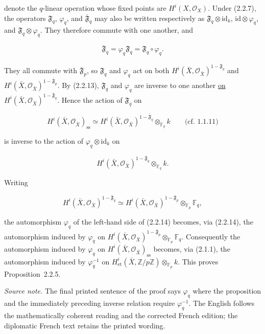 denote the $q$-linear operation whose fixed points are
$H^i(X,\mathcal O_X)$. Under (2.2.7), the operators
$\mathfrak F_q$, $\varphi_q$, and $\overline{\mathfrak F}_q$ may also be
written respectively as
$\mathfrak F_q\otimes\mathrm{id}_k$,
$\mathrm{id}\otimes\varphi_q$, and
$\mathfrak F_q\otimes\varphi_q$. They therefore commute with one another,
and

\begin{equation}\tag{2.2.13}
\overline{\mathfrak F}_q
=\varphi_q\mathfrak F_q
=\mathfrak F_q\circ\varphi_q.
\end{equation}

They all commute with $\overline{\mathfrak F}_p$, so $\mathfrak F_q$ and $\varphi_q$
act on both
$H^i(\bar X,\mathcal O_{\bar X})^{1-\overline{\mathfrak F}_q}$ and
$H^i(\bar X,\mathcal O_{\bar X})^{1-\overline{\mathfrak F}_p}$. By (2.2.13),
$\mathfrak F_q$ and $\varphi_q$ are inverse to one another \underline{on}
$H^i(\bar X,\mathcal O_{\bar X})^{1-\overline{\mathfrak F}_q}$. Hence the
action of $\mathfrak F_q$ on

\[
H^i(\bar X,\mathcal O_{\bar X})_{\mathrm{ss}}
\simeq
H^i(\bar X,\mathcal O_{\bar X})^{1-\overline{\mathfrak F}_q}
\otimes_{\mathbb F_q}k
\qquad\text{(cf. 1.1.11)}
\]

is inverse to the action of $\varphi_q\otimes\mathrm{id}_k$ on

\[
H^i(\bar X,\mathcal O_{\bar X})^{1-\overline{\mathfrak F}_q}
\otimes_{\mathbb F_q}k.
\]

Writing

\begin{equation}\tag{2.2.14}
H^i(\bar X,\mathcal O_{\bar X})^{1-\overline{\mathfrak F}_q}
\simeq
H^i(\bar X,\mathcal O_{\bar X})^{1-\overline{\mathfrak F}_p}
\otimes_{\mathbb F_p}\mathbb F_q,
\end{equation}

the automorphism $\varphi_q$ of the left-hand side of (2.2.14) becomes,
via (2.2.14), the automorphism induced by $\varphi_q$ on
$H^i(\bar X,\mathcal O_{\bar X})^{1-\overline{\mathfrak F}_p}
\otimes_{\mathbb F_p}\mathbb F_q$. Consequently the automorphism induced by
$\varphi_q$ on
$H^i(\bar X,\mathcal O_{\bar X})_{\mathrm{ss}}$ becomes, via (2.1.1), the
automorphism induced by $\varphi_q^{-1}$ on
$H^i_{\mathrm{et}}(\bar X,\mathbb Z/p\mathbb Z)
\otimes_{\mathbb F_p}k$. This proves Proposition~2.2.5.

\medskip
\noindent\emph{Source note.}
The final printed sentence of the proof says $\varphi_q$ where the proposition
and the immediately preceding inverse relation require $\varphi_q^{-1}$.
The English follows the mathematically coherent reading and the corrected
French edition; the diplomatic French text retains the printed wording.
